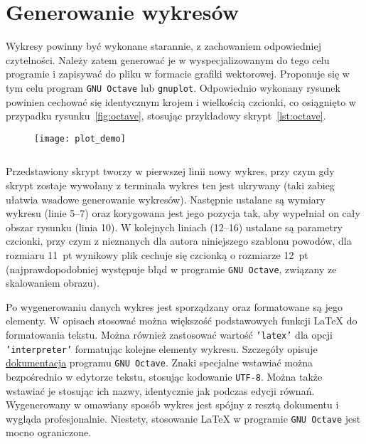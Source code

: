 \chapter{Generowanie wykresów}

Wykresy powinny być wykonane starannie, z zachowaniem odpowiedniej czytelności. Należy zatem generować je w wyspecjalizowanym do tego celu programie i zapisywać do pliku w formacie grafiki wektorowej. Proponuje się w tym celu program \texttt{GNU Octave} lub \texttt{gnuplot}. Odpowiednio wykonany rysunek powinien cechować się identycznym krojem i wielkością czcionki, co osiągnięto w przypadku rysunku~\ref{fig:octave}, stosując przykładowy skrypt~\ref{lst:octave}.

\begin{figure}[htb!]
\texttt{[image: plot\_demo]}
\end{figure}

\begin{listing}[hbt!]
\inputminted[linenos, breaklines]{octave}{skrypty/plot_demo.m}
\end{listing}

Przedstawiony skrypt tworzy w pierwszej linii nowy wykres, przy czym gdy skrypt zostaje wywołany z terminala wykres ten jest ukrywany (taki zabieg ułatwia wsadowe generowanie wykresów). Następnie ustalane są wymiary wykresu (linie 5--7) oraz korygowana jest jego pozycja tak, aby wypełniał on cały obszar rysunku (linia 10). W kolejnych liniach (12--16) ustalane są parametry czcionki, przy czym z nieznanych dla autora niniejszego szablonu powodów, dla rozmiaru \qty{11}{pt} wynikowy plik cechuje się czcionką o rozmiarze \qty{12}{pt} (najprawdopodobniej występuje błąd w programie \texttt{GNU Octave}, związany ze skalowaniem obrazu).

Po wygenerowaniu danych wykres jest sporządzany oraz formatowane są jego elementy. W opisach stosować można większość podstawowych funkcji \LaTeX{} do formatowania tekstu. Można również zastosować wartość \texttt{'latex'} dla opcji \texttt{'interpreter'} formatując kolejne elementy wykresu. Szczegóły opisuje \href{https://docs.octave.org/latest}{dokumentacja} programu \texttt{GNU Octave}. Znaki specjalne wstawiać można bezpośrednio w edytorze tekstu, stosując kodowanie \texttt{UTF-8}. Można także wstawiać je stosując ich nazwy, identycznie jak podczas edycji równań. Wygenerowany w omawiany sposób wykres jest spójny z resztą dokumentu i wygląda profesjonalnie. Niestety, stosowanie \LaTeX{} w programie \texttt{GNU Octave} jest mocno ograniczone.

